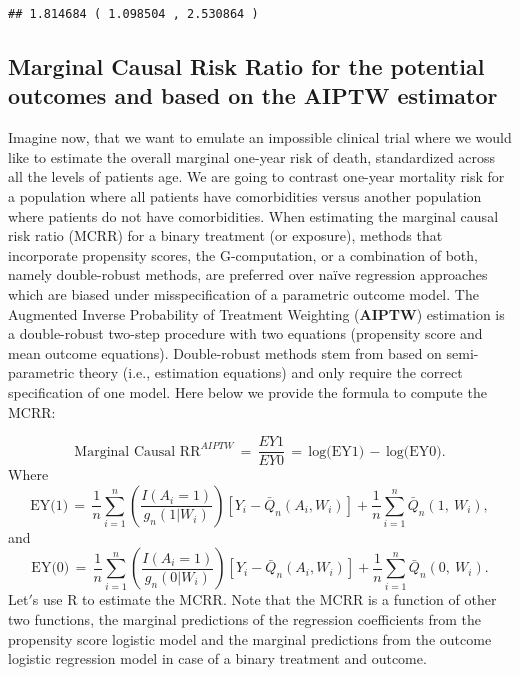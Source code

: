 \documentclass[]{article}
\begin{document}
\begin{verbatim}
## 1.814684 ( 1.098504 , 2.530864 )
\end{verbatim}

\hypertarget{marginal-causal-risk-ratio-for-the-potential-outcomes-and-based-on-the-aiptw-estimator}{%
\subsection{Marginal Causal Risk Ratio for the potential outcomes and
based on the AIPTW
estimator}\label{marginal-causal-risk-ratio-for-the-potential-outcomes-and-based-on-the-aiptw-estimator}}

Imagine now, that we want to emulate an impossible clinical trial where
we would like to estimate the overall marginal one-year risk of death,
standardized across all the levels of patients age. We are going to
contrast one-year mortality risk for a population where all patients
have comorbidities versus another population where patients do not have
comorbidities. When estimating the marginal causal risk ratio (MCRR) for
a binary treatment (or exposure), methods that incorporate propensity
scores, the G-computation, or a combination of both, namely
double-robust methods, are preferred over naïve regression approaches
which are biased under misspecification of a parametric outcome model.
The Augmented Inverse Probability of Treatment Weighting
(\textbf{AIPTW}) estimation is a double-robust two-step procedure with
two equations (propensity score and mean outcome equations).
Double-robust methods stem from based on semi-parametric theory (i.e.,
estimation equations) and only require the correct specification of one
model. Here below we provide the formula to compute the MCRR:

\[\text{Marginal Causal RR}^{AIPTW}\,=\,\frac{EY1}{EY0}\,=\,\text{log(EY1)}\,-\,\text{log(EY0)}.\]
Where
\[\text{EY(1)}\,=\,\frac{1}{n}\sum_{i=1}^{n}\left(\frac{I\left(A_{i}=1\right)}{g_n(1|W_{i})}\right)\left[Y_{i}-\bar{Q}_{n}\left(A_{i},W_{i}\right)\right]+\frac{1}{n}\sum_{i=1}^{n}\bar{Q}_{n}\left(1,\ W_{i}\right),\]
and
\[\text{EY(0)}\,=\,\frac{1}{n}\sum_{i=1}^{n}\left(\frac{I\left(A_{i}=1\right)}{g_n(0|W_{i})}\right)\left[Y_{i}-\bar{Q}_{n}\left(A_{i},W_{i}\right)\right]+\frac{1}{n}\sum_{i=1}^{n}\bar{Q}_{n}\left(0,\ W_{i}\right).\]
Let\('\)s use R to estimate the MCRR. Note that the MCRR is a function
of other two functions, the marginal predictions of the regression
coefficients from the propensity score logistic model and the marginal
predictions from the outcome logistic regression model in case of a
binary treatment and outcome.
\end{document}

